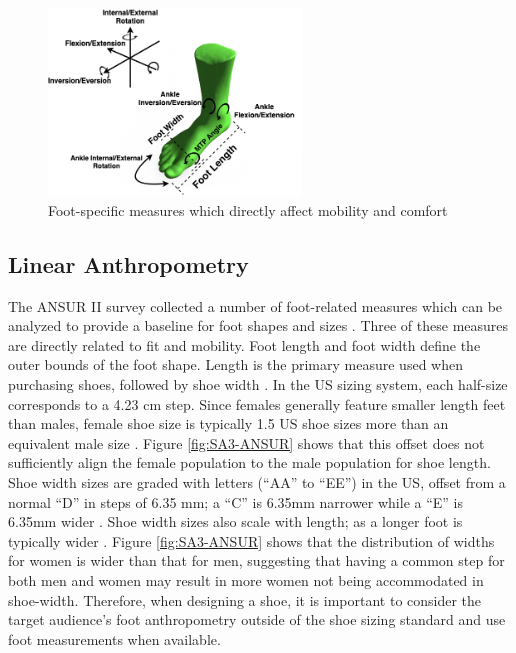 \documentclass[defaultstyle,11pt]{comps}
\begin{document}
\begin{figure}
\hypertarget{fig:SA3-Foot}{%
\centering
\includegraphics[width=0.6\textwidth,height=\textheight]{../fig/SA3/FootOverview.png}
\caption{Foot-specific measures which directly affect mobility and comfort}\label{fig:SA3-Foot}
}
\end{figure}

\hypertarget{linear-anthropometry}{%
\subsection{Linear Anthropometry}\label{linear-anthropometry}}

The ANSUR II survey collected a number of foot-related measures which can be analyzed to provide a baseline for foot shapes and sizes \citep{Gordon2014}.
Three of these measures are directly related to fit and mobility.
Foot length and foot width define the outer bounds of the foot shape.
Length is the primary measure used when purchasing shoes, followed by shoe width \citep{Luximon2013}.
In the US sizing system, each half-size corresponds to a 4.23 cm step.
Since females generally feature smaller length feet than males, female shoe size is typically 1.5 US shoe sizes more than an equivalent male size \citep{Luximon2013}.
Figure \ref{fig:SA3-ANSUR} shows that this offset does not sufficiently align the female population to the male population for shoe length.
Shoe width sizes are graded with letters (``AA'' to ``EE'') in the US, offset from a normal ``D'' in steps of 6.35 mm; a ``C'' is 6.35mm narrower while a ``E'' is 6.35mm wider \citep{Luximon2013}.
Shoe width sizes also scale with length; as a longer foot is typically wider \citep{Jurca2019}.
Figure \ref{fig:SA3-ANSUR} shows that the distribution of widths for women is wider than that for men, suggesting that having a common step for both men and women may result in more women not being accommodated in shoe-width.
Therefore, when designing a shoe, it is important to consider the target audience's foot anthropometry outside of the shoe sizing standard and use foot measurements when available.
\end{document}
